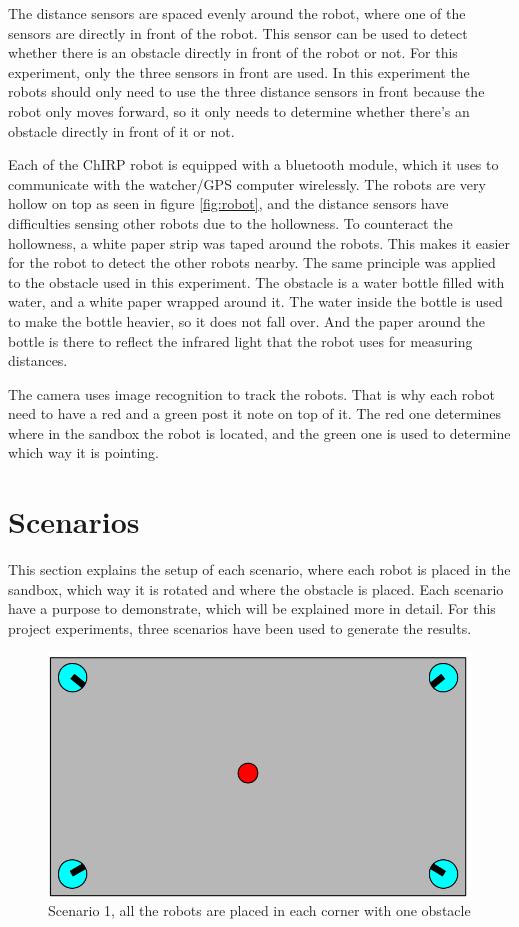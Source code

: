 The distance sensors are spaced evenly around the robot, where one of the sensors are directly in front of the robot. This sensor can be used to detect whether there is an obstacle directly in front of the robot or not. For this experiment, only the three sensors in front are used. In this experiment the robots should only need to use the three distance sensors in front because the robot only moves forward, so it only needs to determine whether there's an obstacle directly in front of it or not.

Each of the ChIRP robot is equipped with a bluetooth module, which it uses to communicate with the watcher/GPS computer wirelessly. 
The robots are very hollow on top as seen in figure \ref{fig:robot}, and the distance sensors have difficulties sensing other robots due to the hollowness. To counteract the hollowness, a white paper strip was taped around the robots. This makes it easier for the robot to detect the other robots nearby. The same principle was applied to the obstacle used in this experiment. The obstacle is a water bottle filled with water, and a white paper wrapped around it. The water inside the bottle is used to make the bottle heavier, so it does not fall over. And the paper around the bottle is there to reflect the infrared light that the robot uses for measuring distances.

The camera uses image recognition to track the robots. That is why each robot need to have a red and a green post it note on top of it. The red one determines where in the sandbox the robot is located, and the green one is used to determine which way it is pointing. 


\section{Scenarios}
This section explains the setup of each scenario, where each robot is placed in the sandbox, which way it is rotated and where the obstacle is placed. Each scenario have a purpose to demonstrate, which will be explained more in detail.
For this project experiments, three scenarios have been used to generate the results.
\label{sec:scenario}
\begin{figure}[h]
\begin{center}
\includegraphics[width=0.8\linewidth]{figs/scenario0}
\end{center}
\caption[scenario 1]{Scenario 1, all the robots are placed in each corner with one obstacle}
\label{fig:scenario0}
\end{figure}

